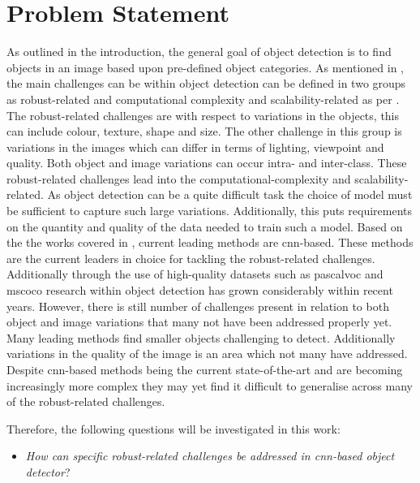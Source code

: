 \section{Problem Statement}
As outlined in the introduction, the general goal of object detection is to find objects in an image based upon pre-defined object categories. As mentioned in , the main challenges can be within object detection can be defined in two groups as robust-related and computational complexity and scalability-related as per \cite{zhang}. The robust-related challenges are with respect to variations in the objects, this can include colour, texture, shape and size. The other challenge in this group is variations in the images which can differ in terms of lighting, viewpoint and quality. Both object and image variations can occur intra- and inter-class. These robust-related challenges lead into the computational-complexity and scalability-related. As object detection can be a quite difficult task the choice of model must be sufficient to capture such large variations. Additionally, this puts requirements on the quantity and quality of the data needed to train such a model. 
Based on the the works covered in , current leading methods are \gls{cnn}-based. These methods are the current leaders in choice for tackling the robust-related challenges. Additionally through the use of high-quality datasets such as \gls{pascalvoc} and \gls{mscoco} research within object detection has grown considerably within recent years. However, there is still number of challenges present in relation to both object and image variations that many not have been addressed properly yet. Many leading methods find smaller objects challenging to detect. Additionally variations in the quality of the image is an area which not many have addressed.
Despite \gls{cnn}-based methods being the current state-of-the-art and are becoming increasingly more complex they may yet find it difficult to generalise across many of the robust-related challenges.

Therefore, the following questions will be investigated in this work:

\begin{itemize}
\item \textit{How can specific robust-related challenges be addressed in \gls{cnn}-based object detector}?
\end{itemize}